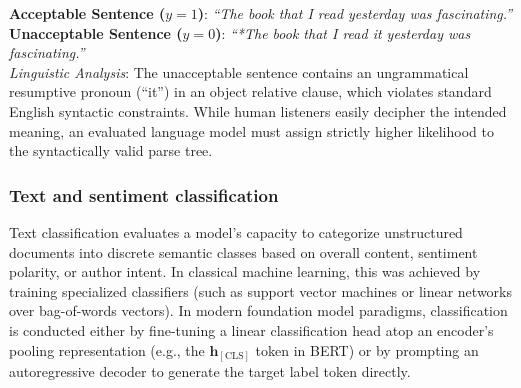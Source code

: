 \documentclass[../../main.tex]{subfiles}
\begin{document}
\begin{center}
\begin{minipage}{0.95\textwidth}
\begin{tcolorbox}[colback=cardBg,colframe=cardLine,arc=2pt,boxrule=0.5pt,title=\textbf{Task Example: Grammatical Acceptability (CoLA)}]
\small\sffamily
\textbf{Acceptable Sentence ($y = 1$)}: \textit{``The book that I read yesterday was fascinating.''} \\
\textbf{Unacceptable Sentence ($y = 0$)}: \textit{``*The book that I read it yesterday was fascinating.''} \\
\textit{Linguistic Analysis}: The unacceptable sentence contains an ungrammatical resumptive pronoun (``it'') in an object relative clause, which violates standard English syntactic constraints. While human listeners easily decipher the intended meaning, an evaluated language model must assign strictly higher likelihood to the syntactically valid parse tree.
\end{tcolorbox}
\end{minipage}
\end{center}

\subsubsection{Text and sentiment classification}
\label{subsec:text_classification}
Text classification evaluates a model's capacity to categorize unstructured documents into discrete semantic classes based on overall content, sentiment polarity, or author intent. In classical machine learning, this was achieved by training specialized classifiers (such as support vector machines or linear networks over bag-of-words vectors). In modern foundation model paradigms, classification is conducted either by fine-tuning a linear classification head atop an encoder's pooling representation (e.g., the $\mathbf{h}_{[\text{CLS}]}$ token in BERT) or by prompting an autoregressive decoder to generate the target label token directly.
\end{document}
